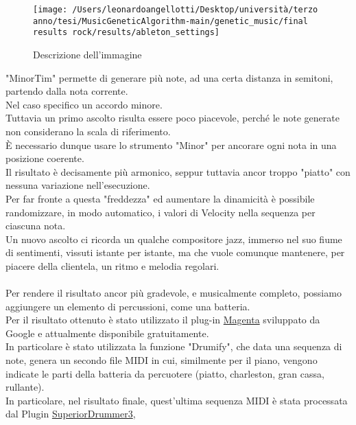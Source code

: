 \documentclass[a4paper,12pt]{report}
\begin{document}
\begin{figure}[h!]
    \centering
    \texttt{[image: /Users/leonardoangellotti/Desktop/università/terzo anno/tesi/MusicGeneticAlgorithm-main/genetic\_music/final results rock/results/ableton\_settings]} 
    \caption{Descrizione dell'immagine}
    \label{fig:immagine}
\end{figure}

"MinorTim" permette di generare più note, ad una certa distanza in semitoni, partendo dalla nota corrente. \\
Nel caso specifico un accordo minore. \\
Tuttavia un primo ascolto risulta essere poco piacevole, perché le note generate non considerano la scala di riferimento. \\
È necessario dunque usare lo strumento "Minor" per ancorare ogni nota in una posizione coerente. \\
Il risultato è decisamente più armonico, seppur tuttavia ancor troppo "piatto" con nessuna variazione nell'esecuzione. \\
Per far fronte a questa "freddezza" ed aumentare la dinamicità è possibile randomizzare, in modo automatico, i valori di Velocity nella sequenza per ciascuna nota. \\
Un nuovo ascolto ci ricorda un qualche compositore jazz, immerso nel suo fiume di sentimenti, vissuti istante per istante, 
ma che vuole comunque mantenere, per piacere della clientela, un ritmo e melodia regolari. \\
\\
Per rendere il risultato ancor più gradevole, e musicalmente completo, possiamo aggiungere un elemento di percussioni, come una batteria. \\
Per il risultato ottenuto è stato utilizzato il plug-in \href{https://magenta.tensorflow.org/studio}{Magenta}  sviluppato da Google e attualmente disponibile gratuitamente. \\
In particolare è stato utilizzata la funzione "Drumify", che data una sequenza di note, genera un secondo file MIDI in cui, similmente per il piano, vengono indicate le parti della batteria da percuotere (piatto, charleston, gran cassa, rullante). \\
In particolare, nel risultato finale, quest'ultima sequenza MIDI è stata processata dal Plugin \href{https://www.toontrack.com/product/superior-drummer-3/?gad_source=1&gclid=Cj0KCQjws560BhCuARIsAHMqE0H2FsGI5sBj5JLtPNhhiKiLf9qMEccOntk8F9uc4_ZvSDPK5TCZZKUaAg1LEALw_wcB}{SuperiorDrummer3},
\end{document}
